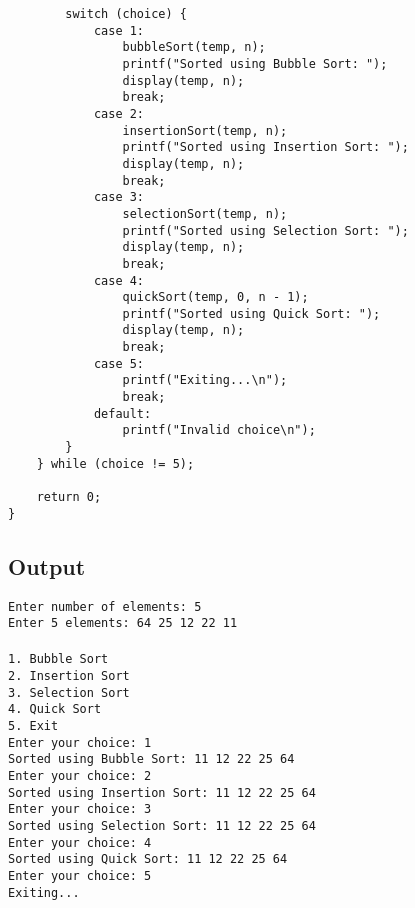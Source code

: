\documentclass[12pt,a4paper]{article}
\begin{document}
\begin{lstlisting}
        switch (choice) {
            case 1:
                bubbleSort(temp, n);
                printf("Sorted using Bubble Sort: ");
                display(temp, n);
                break;
            case 2:
                insertionSort(temp, n);
                printf("Sorted using Insertion Sort: ");
                display(temp, n);
                break;
            case 3:
                selectionSort(temp, n);
                printf("Sorted using Selection Sort: ");
                display(temp, n);
                break;
            case 4:
                quickSort(temp, 0, n - 1);
                printf("Sorted using Quick Sort: ");
                display(temp, n);
                break;
            case 5:
                printf("Exiting...\n");
                break;
            default:
                printf("Invalid choice\n");
        }
    } while (choice != 5);

    return 0;
}
\end{lstlisting}

\subsection*{Output}
\begin{tcolorbox}[terminalstyle, title=Sample Output]
\texttt{Enter number of elements: 5\\
Enter 5 elements: 64 25 12 22 11\\
\\
1. Bubble Sort\\2. Insertion Sort\\3. Selection Sort\\4. Quick Sort\\5. Exit\\
Enter your choice: 1\\
Sorted using Bubble Sort: 11 12 22 25 64\\
Enter your choice: 2\\
Sorted using Insertion Sort: 11 12 22 25 64\\
Enter your choice: 3\\
Sorted using Selection Sort: 11 12 22 25 64\\
Enter your choice: 4\\
Sorted using Quick Sort: 11 12 22 25 64\\
Enter your choice: 5\\
Exiting...}
\end{tcolorbox}

\newpage
\newpage
\newpage
\newpage
\newpage
\newpage
\newpage
\newpage
\newpage
\newpage
\newpage
\newpage
\newpage
\newpage
\newpage
\newpage
\end{document}
